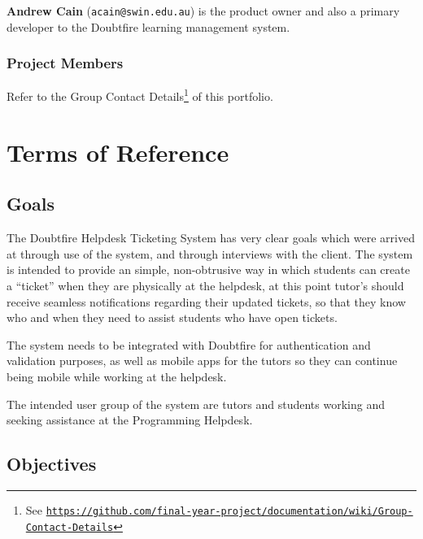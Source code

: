 \documentclass[a4paper,12pt]{article}
\renewcommand{\href}[2]{#2\footnote{See \texttt{\url{#1}}}}
\begin{document}
\textbf{Andrew Cain} (\texttt{acain@swin.edu.au}) is the product owner
and also a primary developer to the Doubtfire learning management
system.

\subsubsection{Project Members}\label{project-members}

Refer to the
\href{https://github.com/final-year-project/documentation/wiki/Group-Contact-Details}{Group
Contact Details} of this portfolio.

\section{Terms of Reference}\label{terms-of-reference}

\subsection{Goals}\label{goals}

The Doubtfire Helpdesk Ticketing System has very clear goals which were
arrived at through use of the system, and through interviews with the
client. The system is intended to provide an simple, non-obtrusive way
in which students can create a ``ticket'' when they are physically at
the helpdesk, at this point tutor's should receive seamless
notifications regarding their updated tickets, so that they know who and
when they need to assist students who have open tickets.

The system needs to be integrated with Doubtfire for authentication and
validation purposes, as well as mobile apps for the tutors so they can
continue being mobile while working at the helpdesk.

The intended user group of the system are tutors and students working
and seeking assistance at the Programming Helpdesk.

\subsection{Objectives}\label{objectives}
\end{document}
